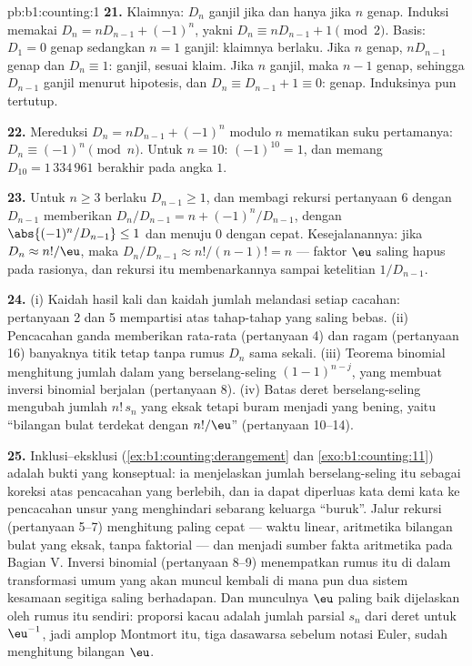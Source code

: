 \begin{solution}{pb:b1:counting:1}
\textbf{21.} Klaimnya: $D_n$ ganjil jika dan hanya jika $n$ genap. Induksi memakai
$D_n = nD_{n-1} + (-1)^n$, yakni $D_n \equiv nD_{n-1} + 1 \pmod 2$.
Basis: $D_1 = 0$ genap sedangkan $n = 1$ ganjil: klaimnya berlaku. Jika $n$ genap,
$nD_{n-1}$ genap dan $D_n \equiv 1$: ganjil, sesuai klaim. Jika $n$
ganjil, maka $n - 1$ genap, sehingga $D_{n-1}$ ganjil menurut hipotesis, dan
$D_n \equiv D_{n-1} + 1 \equiv 0$: genap. Induksinya pun tertutup.

\textbf{22.} Mereduksi $D_n = nD_{n-1} + (-1)^n$ modulo $n$ mematikan
suku pertamanya: $D_n \equiv (-1)^n \pmod n$. Untuk $n = 10$:
$(-1)^{10} = 1$, dan memang $D_{10} = 1\,334\,961$ berakhir pada
angka $1$.

\textbf{23.} Untuk $n \geq 3$ berlaku $D_{n-1} \geq 1$, dan membagi
rekursi pertanyaan 6 dengan $D_{n-1}$ memberikan $D_n/D_{n-1} = n +
(-1)^n/D_{n-1}$, dengan $\abs{(-1)^n/D_{n-1}} \leq 1$ dan menuju
$0$ dengan cepat. Kesejalanannya: jika $D_n \approx n!/\eu$, maka
$D_n/D_{n-1} \approx n!/(n-1)! = n$ --- faktor $\eu$ saling hapus
pada rasionya, dan rekursi itu membenarkannya sampai ketelitian
$1/D_{n-1}$.

\textbf{24.} (i) Kaidah hasil kali dan kaidah jumlah melandasi setiap cacahan:
pertanyaan 2 dan 5 mempartisi   atas tahap-tahap yang
saling bebas. (ii) Pencacahan ganda memberikan rata-rata (pertanyaan 4) dan
ragam (pertanyaan 16) banyaknya titik tetap tanpa
rumus $D_n$ sama sekali. (iii) Teorema binomial menghitung
jumlah dalam yang berselang-seling $(1-1)^{n-j}$, yang membuat inversi binomial
berjalan (pertanyaan 8). (iv) Batas deret berselang-seling mengubah
jumlah $n!\,s_n$ yang eksak tetapi buram menjadi  yang bening,
yaitu ``bilangan bulat terdekat dengan $n!/\eu$'' (pertanyaan 10--14).

\textbf{25.} Inklusi--eksklusi
(\cref{ex:b1:counting:derangement} dan \cref{exo:b1:counting:11})
adalah bukti yang konseptual: ia menjelaskan jumlah berselang-seling itu sebagai
koreksi atas pencacahan yang berlebih, dan ia dapat diperluas kata demi kata ke pencacahan
unsur yang menghindari sebarang keluarga  ``buruk''. Jalur rekursi
(pertanyaan 5--7) menghitung paling cepat --- waktu linear, aritmetika
bilangan bulat yang eksak, tanpa faktorial --- dan menjadi sumber fakta
aritmetika pada Bagian V. Inversi binomial (pertanyaan 8--9) menempatkan
rumus itu di dalam transformasi umum yang akan muncul kembali di mana pun
dua sistem kesamaan segitiga saling berhadapan. Dan
munculnya $\eu$ paling baik dijelaskan oleh rumus itu sendiri: proporsi
 kacau adalah jumlah parsial $s_n$ dari deret
untuk $\eu^{-1}$, jadi amplop Montmort itu, tiga dasawarsa sebelum
notasi Euler, sudah menghitung bilangan $\eu$.

\end{solution}

